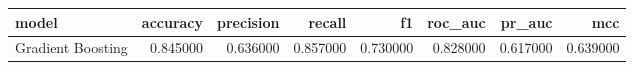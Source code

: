 \begin{tabular}{lrrrrrrr}
\toprule
model & accuracy & precision & recall & f1 & roc\_auc & pr\_auc & mcc \\
\midrule
Gradient Boosting & 0.845000 & 0.636000 & 0.857000 & 0.730000 & 0.828000 & 0.617000 & 0.639000 \\
\bottomrule
\end{tabular}
